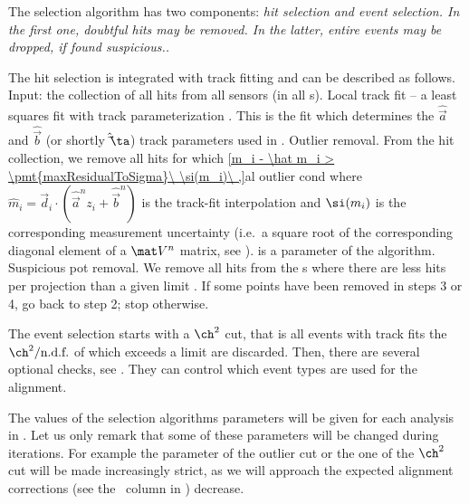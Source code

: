 The selection algorithm has two components: \em{hit selection} and \em{event selection}. In the first one, doubtful hits may be removed. In the latter, entire events may be dropped, if found suspicious..

The hit selection is integrated with track fitting and can be described as follows.
\bitm
\itm Input: the collection of all hits from all sensors (in all s).
\itm Local track fit -- a least squares fit with track parameterization . This is the fit which determines the $\hat\vec a$ and $\hat\vec b$ (or shortly $\hat\vec\ta$) track parameters used in .
\itm Outlier removal. From the hit collection, we remove all hits for which
\eqref{m_i - \hat m_i > \pmt{maxResidualToSigma}\ \si(m_i)\ ,}{al outlier cond}
where $\hat m_i = \vec d_i \cdot (\hat\vec a^n z_i + \hat\vec b^n)$ is the track-fit interpolation and $\si(m_i)$ is the corresponding measurement uncertainty (i.e.~a square root of the corresponding diagonal element of a $\mat V^n$ matrix, see ).  is a parameter of the algorithm.
\itm Suspicious pot removal. We remove all hits from the s where there are less hits per projection than a given limit .
\itm If some points have been removed in steps 3 or 4, go back to step 2; stop otherwise.
\eitm

The event selection starts with a $\ch^2$ cut, that is all events with track fits the $\ch^2/\hbox{n.d.f.}$ of which exceeds a limit  are discarded. Then, there are several optional checks, see . They can control which event types are used for the alignment.


The values of the selection algorithms parameters will be given for each analysis in . Let us only remark that some of these parameters will be changed during iterations. For example the parameter of the outlier cut  or the one of the $\ch^2$ cut will be made increasingly strict, as we will approach the expected alignment corrections (see the \rhs~column in ) decrease.


